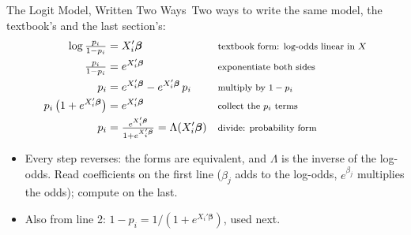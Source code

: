 \documentclass[aspectratio=169,11pt,xcolor=dvipsnames]{beamer}
\newcommand{\core}{\,\raisebox{0.6pt}{\textcolor{corestar}{$\bigstar$}}}
\begin{document}
\begin{frame}{The Logit Model, Written Two Ways\core}
Two ways to write the same model, the textbook's and the last section's:
\begingroup
\setlength{\abovedisplayskip}{2pt}\setlength{\belowdisplayskip}{2pt}
\begin{align*}
  \log\tfrac{p_i}{1-p_i} &= X_i'\bm\beta
    && \text{\footnotesize textbook form: log-odds linear in $X$} \\
  \tfrac{p_i}{1-p_i} &= e^{X_i'\bm\beta}
    && \text{\footnotesize exponentiate both sides} \\
  p_i &= e^{X_i'\bm\beta} - e^{X_i'\bm\beta}\,p_i
    && \text{\footnotesize multiply by $1 - p_i$} \\
  p_i\,\big(1 + e^{X_i'\bm\beta}\big) &= e^{X_i'\bm\beta}
    && \text{\footnotesize collect the $p_i$ terms} \\
  p_i &= \tfrac{e^{X_i'\bm\beta}}{1 + e^{X_i'\bm\beta}} = \Lambda(X_i'\bm\beta)
    && \text{\footnotesize divide: probability form}
\end{align*}
\endgroup
\begin{itemize}\itemsep2pt
  \item Every step reverses: the forms are equivalent, and $\Lambda$ is
        the inverse of the log-odds. Read coefficients on the first line
        ($\beta_j$ adds to the log-odds, $e^{\beta_j}$ multiplies the
        odds); compute on the last.
  \item Also from line 2: $1 - p_i = 1/(1 + e^{X_i'\bm\beta})$, used next.
\end{itemize}
\end{frame}
\end{document}
